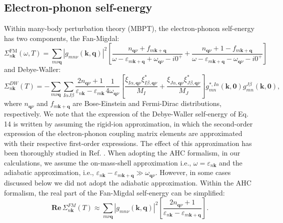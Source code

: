 \documentclass[journal=jctcce,manuscript=article]{achemso}
\newcommand{\bfk}{{\mathbf{k}}}
\newcommand{\bfq}{{\mathbf{q}}}
\begin{document}
\subsection{Electron-phonon self-energy}
Within many-body perturbation theory (MBPT)\cite{giustino2017electron,martin2016interacting}, the electron-phonon self-energy has two components, the Fan-Migdal:
\begin{equation}
    \Sigma_{n\mathbf{k}}^\mathrm{FM}(\omega,T) = \sum_{m\nu\mathbf{q}}\left|g_{mn\nu}(\mathbf{k},\mathbf{q})\right|^2\left[\frac{n_{\mathbf{q}\nu}+f_{m\mathbf{k}+\mathbf{q}}}{\omega-\varepsilon_{m\mathbf{k}+\mathbf{q}}+\omega_{\mathbf{q}\nu}-i0^+}+\frac{n_{\mathbf{q}\nu}+1-f_{m\mathbf{k}+\mathbf{q}}}{\omega-\varepsilon_{m\mathbf{k}+\mathbf{q}}-\omega_{\mathbf{q}\nu}-i0^+}\right]
    \label{eq:FM}
\end{equation}
and Debye-Waller:
\begin{equation}
    \Sigma_{n\mathbf{k}}^{DW}(T)=-\sum_{m\nu\mathbf{q}}\sum_{I\alpha J\beta}\frac{2n_{\mathbf{q}\nu}+1}{\varepsilon_{n\mathbf{k}}-\varepsilon_{m\mathbf{k}}}\frac{1}{4\omega_{\mathbf{q}\nu}}\left[\frac{\xi_{I\alpha,\mathbf{q}\nu}\xi_{I\beta,\mathbf{q}\nu}^*}{M_I} +\frac{\xi_{J\alpha,\mathbf{q}\nu}\xi_{J\beta,\mathbf{q}\nu}^*}{M_J}\right]g^{*,I\alpha}_{mn}(\mathbf{k},\mathbf{0})g^{J\beta}_{mn}(\mathbf{k},\mathbf{0}),
    \label{eq:DW}
\end{equation}
where $n_{\bfq\nu}$ and $f_{m\bfk+\bfq}$ are Bose-Einstein and Fermi-Dirac distributions, respectively. We note that the expression of the Debye-Waller self-energy of Eq. 14 is written by  assuming the rigid-ion approximation, in which the second-order expression of the electron-phonon coupling matrix elements are approximated with their respective  first-order expressions. The effect of this approximation has been thoroughly studied in Ref. . When adopting the AHC formalism,\cite{allen1976theory,allen1981theory} in our calculations, we assume the on-mass-shell approximation i.e., $\omega = \varepsilon_{n\bfk}$ and the adiabatic approximation, i.e., $\varepsilon_{n\bfk}-\varepsilon_{m\bfk+\bfq} \gg \omega_{\bfq\nu}$. However, in some cases discussed below we did not adopt the adiabatic approximation.  Within the AHC formalism, the real part of the Fan-Migdal self-energy can be simplified:
\begin{equation}
    \mathbf{Re}\,\Sigma^{FM}_{n\bfk}(T) \approx \sum_{m\nu\bfq}|g_{mn\nu}(\bfk,\bfq)|^2\left[ \frac{2n_{\bfq\nu}+1}{\varepsilon_{n\bfk}-\varepsilon_{m\bfk+\bfq}} \right].
    \label{eq:FMAHC}
\end{equation}
\end{document}
